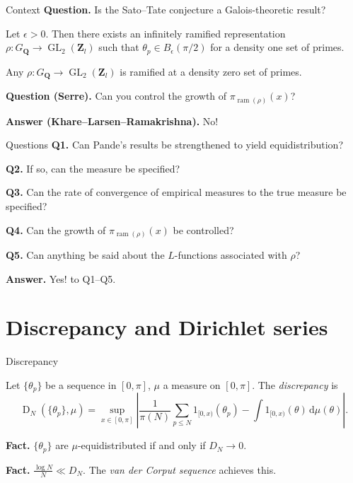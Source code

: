 \documentclass{beamer}
\DeclareMathOperator{\D}{D}
\DeclareMathOperator{\GL}{GL}
\DeclareMathOperator{\ram}{ram}
\newcommand{\bQ}{\mathbf{Q}}
\newcommand{\bZ}{\mathbf{Z}}
\newcommand{\dd}{\mathrm{d}}
\begin{document}
\begin{frame}{Context}
\textbf{Question.} 
Is the Sato--Tate conjecture a Galois-theoretic result?
\pause

\begin{theorem}[Pande]
Let $\epsilon>0$. Then there exists an infinitely ramified representation 
$\rho\colon G_\bQ \to \GL_2(\bZ_l)$ such that $\theta_p\in B_\epsilon(\pi/2)$ 
for a density one set of primes. 
\end{theorem}
\pause

\begin{theorem}
Any $\rho\colon G_\bQ \to \GL_2(\bZ_l)$ is ramified at a density zero set of 
primes. 
\end{theorem}
\pause

\textbf{Question (Serre).} Can you control the growth of 
$\pi_{\ram(\rho)}(x)$?
\pause

\textbf{Answer (Khare--Larsen--Ramakrishna).} No!
\end{frame}



\begin{frame}{Questions}
\textbf{Q1.} Can Pande's results be strengthened to yield equidistribution? 
\pause

\textbf{Q2.} If so, can the measure be specified?
\pause

\textbf{Q3.} Can the rate of convergence of empirical measures to the true measure 
be specified?
\pause

\textbf{Q4.} Can the growth of $\pi_{\ram(\rho)}(x)$ be controlled?
\pause

\textbf{Q5.} Can anything be said about the $L$-functions associated with $\rho$?
\pause

\textbf{Answer.} Yes! to Q1--Q5. 
\end{frame}





\section{Discrepancy and Dirichlet series}

\begin{frame}{Discrepancy}
\begin{definition}
Let $\{\theta_p\}$ be a sequence in $[0,\pi]$, $\mu$ a measure on $[0,\pi]$. 
The \emph{discrepancy} is 
\[
	\D_N(\{\theta_p\},\mu) =  \sup_{x\in [0,\pi]}\left| \frac{1}{\pi(N)} \sum_{p\leqslant N} 1_{[0,x)}(\theta_p) - \int 1_{[0,x)}(\theta) \, \dd\mu(\theta)\right| .
\]
\end{definition}
\pause

\textbf{Fact.}
$\{\theta_p\}$ are $\mu$-equidistributed if and only if $D_N \to 0$. 
\pause

\textbf{Fact.}
$\frac{\log N}{N} \ll D_N$. The \emph{van der Corput sequence} achieves this. 
\end{frame}
\end{document}
